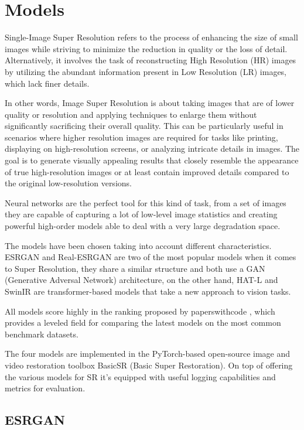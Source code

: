 \newpage
\chapter{Models}
\label{cha:models}

Single-Image Super Resolution refers to the process of enhancing the size of small images while striving to minimize the reduction in quality or the loss of detail. Alternatively, it involves the task of reconstructing High Resolution (HR) images by utilizing the abundant information present in Low Resolution (LR) images, which lack finer details.

In other words, Image Super Resolution is about taking images that are of lower quality or resolution and applying techniques to enlarge them without significantly sacrificing their overall quality. This can be particularly useful in scenarios where higher resolution images are required for tasks like printing, displaying on high-resolution screens, or analyzing intricate details in images. The goal is to generate visually appealing results that closely resemble the appearance of true high-resolution images or at least contain improved details compared to the original low-resolution versions.

Neural networks are the perfect tool for this kind of task, from a set of images they are capable of capturing a lot of low-level image statistics and creating powerful high-order models able to deal with a very large degradation space.

The models have been chosen taking into account different characteristics. ESRGAN and Real-ESRGAN are two of the most popular models when it comes to Super Resolution, they share a similar structure and both use a GAN (Generative Adversal Network) architecture, on the other hand, HAT-L and SwinIR are transformer-based models that take a new approach to vision tasks.

All models score highly in the ranking proposed by paperswithcode \cite{pwcode}, which provides a leveled field for comparing the latest models on the most common benchmark datasets.

The four models are implemented in the PyTorch-based open-source image and video restoration toolbox BasicSR (Basic Super Restoration). On top of offering the various models for SR it's equipped with useful logging capabilities and metrics for evaluation.


\section{ESRGAN}
\label{subsec:esrgan}

